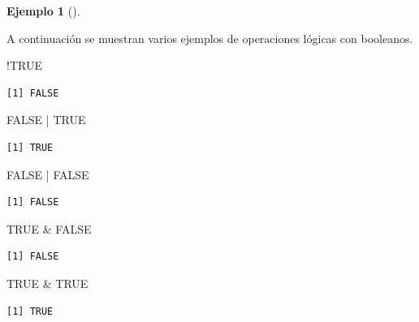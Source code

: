 \documentclass[
  a4paper,
]{scrreport}
\newenvironment{Shaded}{\begin{snugshade}}{\end{snugshade}}
\newcommand{\ConstantTok}[1]{\textcolor[rgb]{0.56,0.35,0.01}{#1}}
\newcommand{\SpecialCharTok}[1]{\textcolor[rgb]{0.37,0.37,0.37}{#1}}
\theoremstyle{definition}
\theoremstyle{definition}
\newtheorem{example}{Ejemplo}[chapter]
\theoremstyle{remark}
\begin{document}
\leavevmode{}%
\begin{example}[]\label{exm-operadores-logicos}

A continuación se muestran varios ejemplos de operaciones lógicas con
booleanos.

\begin{Shaded}
\begin{Highlighting}[]
\SpecialCharTok{!}\ConstantTok{TRUE}
\end{Highlighting}
\end{Shaded}

\begin{verbatim}
[1] FALSE
\end{verbatim}

\begin{Shaded}
\begin{Highlighting}[]
\ConstantTok{FALSE} \SpecialCharTok{|} \ConstantTok{TRUE}
\end{Highlighting}
\end{Shaded}

\begin{verbatim}
[1] TRUE
\end{verbatim}

\begin{Shaded}
\begin{Highlighting}[]
\ConstantTok{FALSE} \SpecialCharTok{|} \ConstantTok{FALSE}
\end{Highlighting}
\end{Shaded}

\begin{verbatim}
[1] FALSE
\end{verbatim}

\begin{Shaded}
\begin{Highlighting}[]
\ConstantTok{TRUE} \SpecialCharTok{\&} \ConstantTok{FALSE}
\end{Highlighting}
\end{Shaded}

\begin{verbatim}
[1] FALSE
\end{verbatim}

\begin{Shaded}
\begin{Highlighting}[]
\ConstantTok{TRUE} \SpecialCharTok{\&} \ConstantTok{TRUE}
\end{Highlighting}
\end{Shaded}

\begin{verbatim}
[1] TRUE
\end{verbatim}

\end{example}
\end{document}

